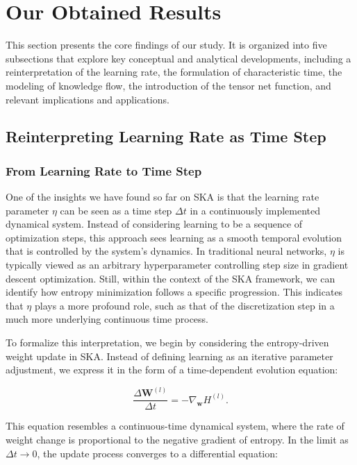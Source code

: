 \documentclass{article}
\begin{document}
\section{Our Obtained Results}
This section presents the core findings of our study. It is organized into five subsections that explore key conceptual and analytical developments, including a reinterpretation of the learning rate, the formulation of characteristic time, the modeling of knowledge flow, the introduction of the tensor net function, and relevant implications and applications.
\subsection{Reinterpreting Learning Rate as Time Step}

\subsubsection{From Learning Rate to Time Step}

One of the insights we have found so far on SKA is that the learning rate parameter \( \eta \) can be seen as a time step \( \Delta t \) in a continuously implemented dynamical system. Instead of considering learning to be a sequence of optimization steps, this approach sees learning as a smooth temporal evolution that is controlled by the system’s dynamics. In traditional neural networks, \( \eta \) is typically viewed as an arbitrary hyperparameter controlling step size in gradient
descent optimization. Still, within the context of the SKA framework, we can identify how entropy minimization follows a specific progression. This indicates that \( \eta \) plays a more profound role, such as that of the discretization step in a much more underlying continuous time process.
	
To formalize this interpretation, we begin by considering the entropy-driven weight update in SKA. Instead of defining learning as an iterative parameter adjustment, we express it in the form of a time-dependent evolution equation:
	
	\begin{equation}
		\frac{\Delta \mathbf{W}^{(l)}}{\Delta t} = -\nabla_{\mathbf{w}} H^{(l)}.
	\end{equation}
	
	This equation resembles a continuous-time dynamical system, where the rate of weight change is proportional to the negative gradient of entropy. In the limit as \( \Delta t \to 0 \), the update process converges to a differential equation:
	
\end{document}
